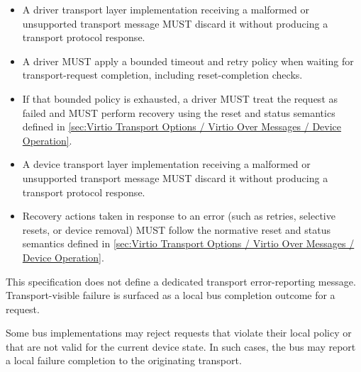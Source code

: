 \begin{itemize}
  \item A driver transport layer implementation receiving a malformed or
        unsupported transport message MUST discard it without producing a
        transport protocol response.
  \item A driver MUST apply a bounded timeout and retry policy when waiting for
        transport-request completion, including reset-completion checks.
  \item If that bounded policy is exhausted, a driver MUST treat the request as
        failed and MUST perform recovery using the reset and status semantics
        defined in
        \ref{sec:Virtio Transport Options / Virtio Over Messages / Device Operation}.
\end{itemize}

\begin{itemize}
  \item A device transport layer implementation receiving a malformed or
        unsupported transport message MUST discard it without producing a
        transport protocol response.
  \item Recovery actions taken in response to an error (such as retries,
        selective resets, or device removal) MUST follow the normative reset and
        status semantics defined in
        \ref{sec:Virtio Transport Options / Virtio Over Messages / Device Operation}.
\end{itemize}

This specification does not define a dedicated transport error-reporting
message. Transport-visible failure is surfaced as a local bus completion
outcome for a request.

Some bus implementations may reject requests that violate their local policy
or that are not valid for the current device state. In such cases, the bus may
report a local failure completion to the originating transport.

